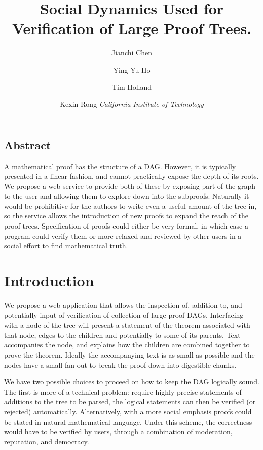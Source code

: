 \documentclass{acm_proc_article-sp}
\begin{document}
\date{}

\title{\Large \bf Social Dynamics Used for Verification of Large Proof Trees.}

\author{
{\rm Jianchi Chen}\and
{\rm Ying-Yu Ho}\and
{\rm Tim Holland}\and
{\rm Kexin Rong}
{\em California Institute of Technology}
}

\maketitle

\thispagestyle{empty}

\subsection*{Abstract}
A mathematical proof has the structure of a DAG. However, it is typically
presented in a linear fashion, and cannot practically expose the depth of its
roots. We propose a web service to provide both of these by exposing part of
the graph to the user and allowing them to explore down into the subproofs.
Naturally it would be prohibitive for the authors to write even a useful amount
of the tree in, so the service allows the introduction of new proofs to expand
the reach of the proof trees. Specification of proofs could either be very
formal, in which case a program could verify them or more relaxed and reviewed
by other users in a social effort to find mathematical truth.

\section{Introduction}
We propose a web application that allows the inspection of, addition to, and
potentially input of verification of collection of large proof DAGs.
Interfacing with a node of the tree will present a statement of the theorem
associated with that node, edges to the children and potentially to some of its
parents. Text accompanies the node, and explains how the children are combined
together to prove the theorem. Ideally the accompanying text is as small as
possible and the nodes have a small fan out to break the proof down into
digestible chunks.

We have two possible choices to proceed on how to keep the DAG logically sound.
The first is more of a technical problem: require highly precise statements of
additions to the tree to be parsed, the logical statements can then be verified
(or rejected) automatically. Alternatively, with a more social emphasis proofs
could be stated in natural mathematical language. Under this scheme, the
correctness would have to be verified by users, through a combination
of moderation, reputation, and democracy.
\end{document}

